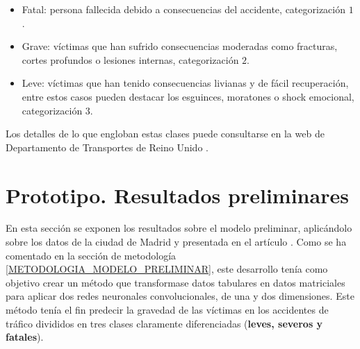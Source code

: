 \begin{itemize}
	\item Fatal: persona fallecida debido a consecuencias del accidente, categorización $1$.
	\item Grave: víctimas que han sufrido consecuencias moderadas como fracturas, cortes profundos o lesiones internas, categorización $2$.
	\item Leve: víctimas que han tenido consecuencias livianas y de fácil recuperación, entre estos casos pueden destacar los esguinces, moratones o shock emocional, categorización $3$.
\end{itemize}

Los detalles de lo que engloban estas clases puede consultarse en la web de Departamento de Transportes de Reino Unido \cite{UKDepartmentSeverityDefinition}.


\section{Prototipo. Resultados preliminares}






En esta sección se exponen los resultados sobre el modelo preliminar, aplicándolo sobre los datos de la ciudad de Madrid y presentada en el artículo \cite{PEREZSALA2023113245}. Como se ha comentado en la sección de metodología \ref{METODOLOGIA_MODELO_PRELIMINAR}, este desarrollo tenía como objetivo crear un método que transformase datos tabulares en datos matriciales para aplicar dos redes neuronales convolucionales, de una y dos dimensiones. Este método tenía el fin predecir la gravedad de las víctimas en los accidentes de tráfico divididos en tres clases claramente diferenciadas (\textbf{leves, severos y fatales}). 

